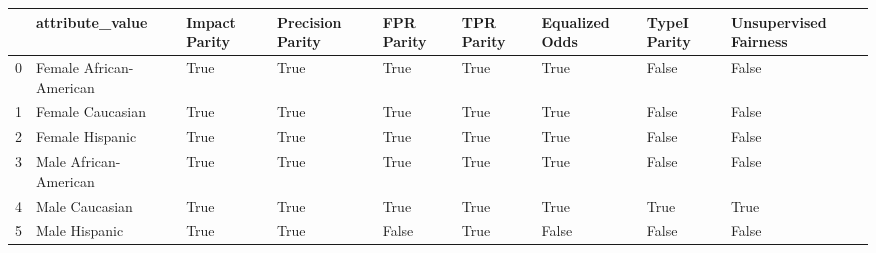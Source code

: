 \begin{tabular}{lllllllll}
\toprule
{} &          attribute\_value &  Impact Parity &  Precision Parity &  FPR Parity &  TPR Parity &  Equalized Odds &  TypeI Parity &  Unsupervised Fairness \\
\midrule
0 &  Female African-American &           True &              True &        True &        True &            True &         False &                  False \\
1 &         Female Caucasian &           True &              True &        True &        True &            True &         False &                  False \\
2 &          Female Hispanic &           True &              True &        True &        True &            True &         False &                  False \\
3 &    Male African-American &           True &              True &        True &        True &            True &         False &                  False \\
4 &           Male Caucasian &           True &              True &        True &        True &            True &          True &                   True \\
5 &            Male Hispanic &           True &              True &       False &        True &           False &         False &                  False \\
\bottomrule
\end{tabular}
